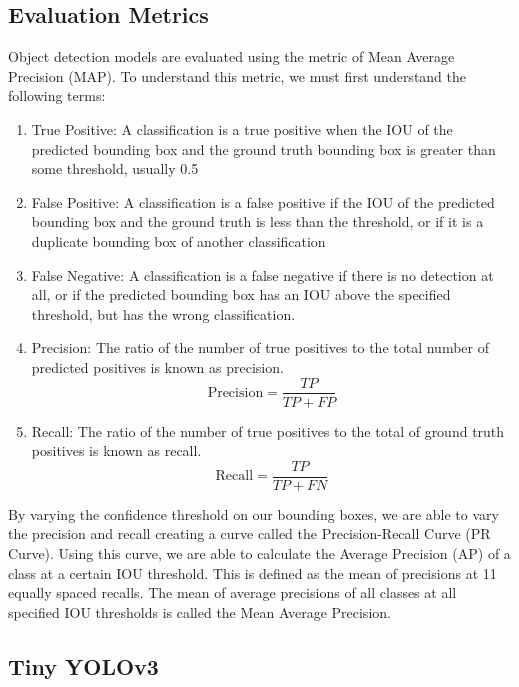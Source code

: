 \documentclass[12pt,letterpaper]{article}
\begin{document}
\subsection{Evaluation Metrics}

Object detection models are evaluated using the metric of Mean Average Precision (MAP). To understand this metric, we must first understand the following terms:

\begin{enumerate}

    \item True Positive: A classification is a true positive when the IOU of the predicted bounding box and the ground truth bounding box is greater than some threshold, usually 0.5

    \item False Positive: A classification is a false positive if the IOU of the predicted bounding box and the ground truth is less than the threshold, or if it is a duplicate bounding box of another classification

    \item False Negative: A classification is a false negative if there is no detection at all, or if the predicted bounding box has an IOU above the specified threshold, but has the wrong classification.

    \item Precision: The ratio of the number of true positives to the total number of predicted positives is known as precision.
        \[ \text{Precision} = \frac{TP}{TP+FP} \]

    \item Recall: The ratio of the number of true positives to the total of ground truth positives is known as recall.
        \[ \text{Recall} = \frac{TP}{TP+FN}  \]

\end{enumerate}

By varying the confidence threshold on our bounding boxes, we are able to vary the precision and recall creating a curve called the Precision-Recall Curve (PR Curve). Using this curve, we are able to calculate the Average Precision (AP) of a class at a certain IOU threshold. This is defined as the mean of precisions at 11 equally spaced recalls. The mean of average precisions of all classes at all specified IOU thresholds is called the Mean Average Precision.

\subsection{Tiny YOLOv3}
\end{document}
